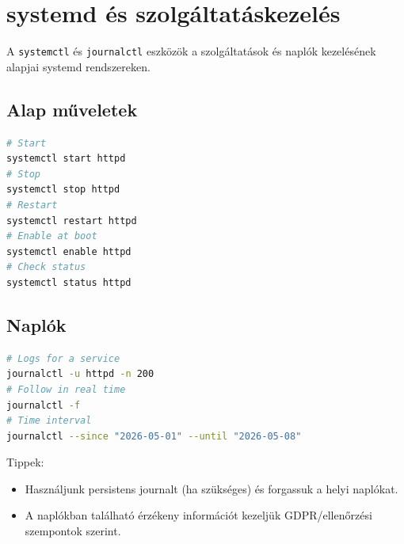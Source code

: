 \section{systemd és szolgáltatáskezelés}

A \texttt{systemctl} és \texttt{journalctl} eszközök a szolgáltatások és naplók kezelésének alapjai systemd rendszereken.

\subsection{Alap műveletek}
\begin{lstlisting}[language=bash]
# Start
systemctl start httpd
# Stop
systemctl stop httpd
# Restart
systemctl restart httpd
# Enable at boot
systemctl enable httpd
# Check status
systemctl status httpd
\end{lstlisting}

\subsection{Naplók}
\begin{lstlisting}[language=bash]
# Logs for a service
journalctl -u httpd -n 200
# Follow in real time
journalctl -f
# Time interval
journalctl --since "2026-05-01" --until "2026-05-08"
\end{lstlisting}

Tippek:
\begin{itemize}
  \item Használjunk persistens journalt (ha szükséges) és forgassuk a helyi naplókat.
  \item A naplókban található érzékeny információt kezeljük GDPR/ellenőrzési szempontok szerint.
\end{itemize}
